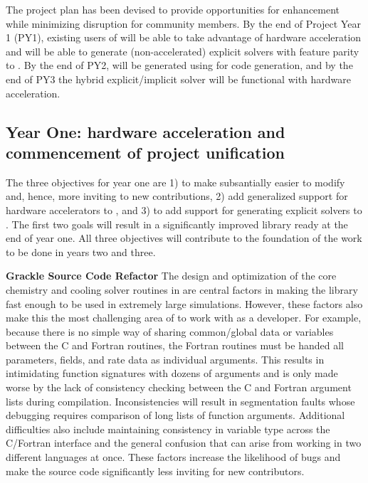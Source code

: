 The project plan has been devised to provide opportunities for enhancement
while minimizing disruption for community members.  By the end of Project Year
1 (PY1), existing users of \grackle{} will be able to take advantage of hardware
acceleration and \dengo{} will be able to generate (non-accelerated) explicit
solvers with feature parity to \grackle{}.  By the end of PY2, \grackle{} will
be generated using \dengo{} for code generation, and by the end of PY3 the
hybrid explicit/implicit solver will be functional with hardware acceleration.

\subsection{Year One: hardware acceleration and commencement of project unification}

The three objectives for year one are 1) to make \grackle{} subsantially
easier to modify and, hence, more inviting to new contributions, 2)
add generalized support for hardware accelerators to \grackle{}, and
3) to add support for generating explicit solvers to \dengo{}.  The
first two goals will result in a significantly improved \grackle{}
library ready at the end of year one. All three objectives will
contribute to the foundation of the work to be done in years two and
three.

\noindent \textbf{Grackle Source Code Refactor}
The design and optimization of the core chemistry and cooling solver
routines in \grackle{} are central factors in making the library fast
enough to be used in extremely large simulations.  However, these
factors also make this the most challenging area of \grackle{} to
work with as a developer.  For example, because there is no simple way
of sharing common/global data or variables between the C and Fortran
routines, the Fortran routines must be handed all parameters, fields,
and rate data as individual arguments.  This results in intimidating
function signatures with dozens of arguments and is only made worse by
the lack of consistency checking between the C and Fortran argument
lists during compilation.  Inconsistencies will result in segmentation
faults whose debugging requires comparison of long lists of function
arguments.  Additional difficulties also include maintaining
consistency in variable type across the C/Fortran interface and the
general confusion that can arise from working in two different
languages at once.  These factors increase the likelihood of bugs and
make the source code significantly less inviting for new
contributors.

